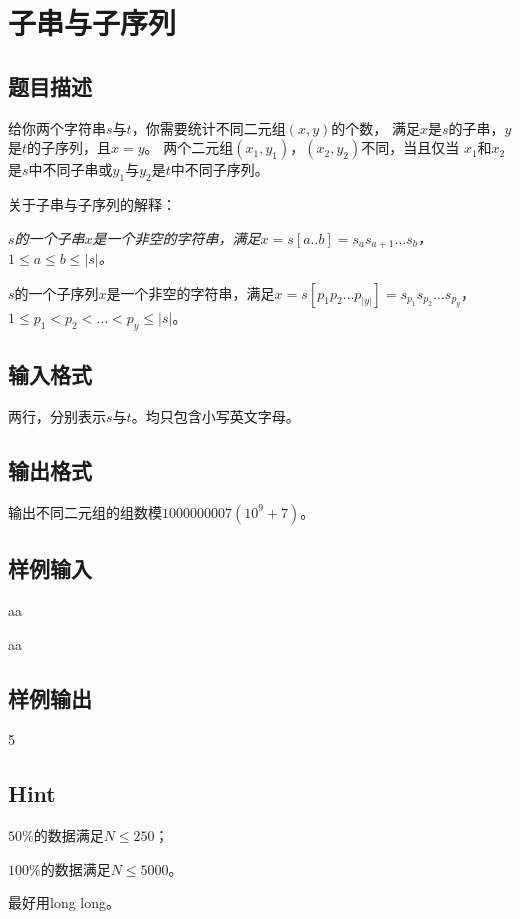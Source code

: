 \section{子串与子序列}
\subsection{题目描述}
\par 给你两个字符串$s$与$t$，你需要统计不同二元组$(x,y)$的个数，
满足$x$是$s$的子串，$y$是$t$的子序列，且$x = y$。
两个二元组$(x_1, y_1)$，$(x_2, y_2)$不同，当且仅当
$x_1$和$x_2$是$s$中不同子串或$y_1$与$y_2$是$t$中不同子序列。
\par 关于子串与子序列的解释：
\par { \itshape 
	$s$的一个子串$x$是一个非空的字符串，满足$x = s[a..b] = s_as_{a+1} \ldots s_b$，$1 \le a \le b \le |s|$。
		\par
	$s$的一个子序列$x$是一个非空的字符串，满足$x = s[p_1p_2 \ldots  p_{|y|}] = s_{p_1}s_{p_2} \ldots s_{p_y}$，$1 \le p_1 < p_2 < \ldots < p_y \le |s|$。
}
\subsection{输入格式}
两行，分别表示$s$与$t$。均只包含小写英文字母。
\subsection{输出格式}
输出不同二元组的组数模$1000000007(10^9+7)$。
\subsection{样例输入}
aa \par
aa
\subsection{样例输出}
5
\subsection{Hint}
\par
$50\%$的数据满足$N \le 250$；
\par
$100\%$的数据满足$N \le 5000$。
\par
最好用long long。
